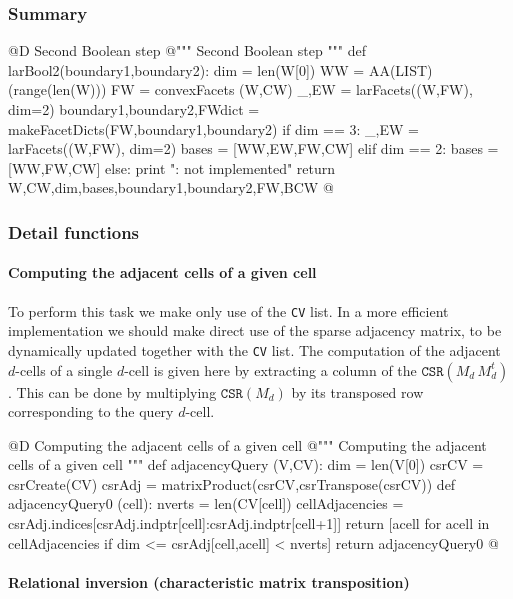 \documentclass[11pt,oneside]{article}	%
\begin{document}
\subsubsection{Summary}

@D Second Boolean step
@{""" Second Boolean step """
def larBool2(boundary1,boundary2):
	dim = len(W[0])
	WW = AA(LIST)(range(len(W)))
	FW = convexFacets (W,CW)
	_,EW = larFacets((W,FW), dim=2)
	boundary1,boundary2,FWdict = makeFacetDicts(FW,boundary1,boundary2)
	if dim == 3: 
		_,EW = larFacets((W,FW), dim=2)
		bases = [WW,EW,FW,CW]
	elif dim == 2: bases = [WW,FW,CW]
	else: print "\nerror: not implemented\n"
	return W,CW,dim,bases,boundary1,boundary2,FW,BCW
@}

\subsubsection{Detail functions}


\paragraph{Computing the adjacent cells of a given cell}
To perform this task we make only use of the \texttt{CV} list. In a more efficient implementation we should make direct use of the sparse adjacency matrix, to be dynamically updated together with the \texttt{CV} list.
The computation of the adjacent $d$-cells of a single $d$-cell is given here by extracting a column of the $\texttt{CSR}(M_d\, M_d^t)$. This can be done by multiplying $\texttt{CSR}(M_d)$ by its transposed row corresponding to the query $d$-cell. 

@D Computing the adjacent cells of a given cell
@{""" Computing the adjacent cells of a given cell """
def adjacencyQuery (V,CV):
	dim = len(V[0])
	csrCV =  csrCreate(CV)
	csrAdj = matrixProduct(csrCV,csrTranspose(csrCV))
	def adjacencyQuery0 (cell):
		nverts = len(CV[cell])
		cellAdjacencies = csrAdj.indices[csrAdj.indptr[cell]:csrAdj.indptr[cell+1]]
		return [acell for acell in cellAdjacencies if dim <= csrAdj[cell,acell] < nverts]
	return adjacencyQuery0
@}


\paragraph{Relational inversion (characteristic matrix transposition)}
\end{document}
